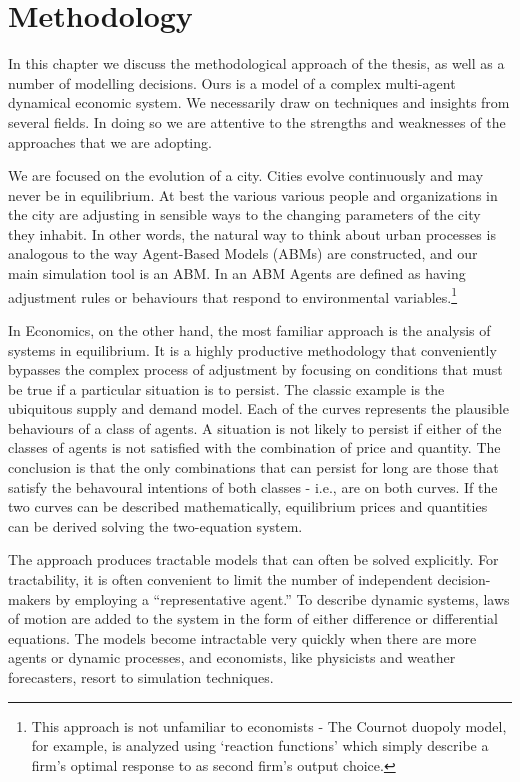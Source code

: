 \chapter{Methodology} \label{chapter-methodology}

In this chapter we discuss the methodological approach of the thesis, as well as a number of modelling decisions. Ours is a model of a complex multi-agent dynamical economic system. We necessarily draw on techniques and insights from several fields. In doing so we are attentive to the strengths and weaknesses of the approaches that we are adopting. 

We are focused on the evolution of a city. Cities evolve continuously and may never be in  equilibrium. At best the various various people and organizations in the city are adjusting in sensible ways to the changing parameters of the city they inhabit. In other words, the natural way to think about urban processes is analogous to the way Agent-Based Models (ABMs)  are constructed, and our main simulation tool is an ABM. In an ABM Agents are defined as having adjustment rules or behaviours that respond to environmental variables.\footnote{This approach is not unfamiliar to economists - The Cournot duopoly model, for example,  is analyzed using  `reaction functions' which simply describe a firm's optimal response to as second firm's output choice.}

In Economics, on the other hand, the most familiar approach is the  analysis of systems in equilibrium. It is a highly productive methodology that conveniently  bypasses the complex process of adjustment by focusing on conditions that must be true if a particular situation is to persist. The classic example is the ubiquitous supply and demand model. Each of the curves represents the plausible behaviours of a class of agents. A  situation is not likely to persist if either of the classes of agents is not satisfied with the combination of price and quantity. The conclusion   is that the only combinations that can persist for long are  those that satisfy the behavoural intentions of both classes - i.e., are on both curves. If the two curves can be described mathematically, equilibrium prices and quantities can be derived solving the two-equation system.

The approach produces tractable  models that can often be solved explicitly. For tractability, it is often convenient to limit the number of independent decision-makers by employing a ``representative agent.'' To describe dynamic systems, laws of motion are added to the system in the form of either difference or differential equations. The models become intractable very quickly when there are more agents or dynamic processes, and economists, like physicists and weather forecasters, resort to simulation techniques. 


